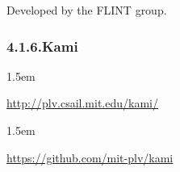 \documentclass[12pt,twoside]{article}
\begin{document}
\noindent{}Developed by the FLINT group.%

\subsubsection{4.1.6.\hspace*{0.5em}Kami}\label{sec-kami}%

\begin{mddefinitions}%


\begin{mdbmarginx}{}{}{}{1.5em}%
\begin{mddefdata}%
\href{http://plv.csail.mit.edu/kami/}{{\ttfamily http://\hspace{0pt}plv.\hspace{0pt}csail.\hspace{0pt}mit.\hspace{0pt}edu/\hspace{0pt}kami/\hspace{0pt}}}
\end{mddefdata}%
\end{mdbmarginx}%


\begin{mdbmarginx}{}{}{}{1.5em}%
\begin{mddefdata}%
\href{https://github.com/mit-plv/kami}{{\ttfamily https://\hspace{0pt}github.\hspace{0pt}com/\hspace{0pt}mit-\hspace{0pt}plv/\hspace{0pt}kami}}%
\end{mddefdata}%
\end{mdbmarginx}%
\end{mddefinitions}%
\end{document}
